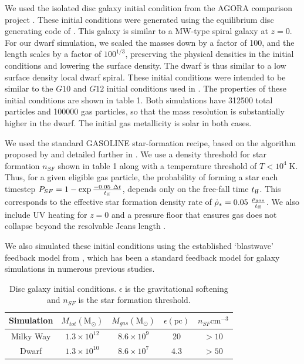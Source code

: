 We used the isolated disc galaxy initial condition from the AGORA comparison
project \citep{Kim2013}.  These initial conditions were generated using the
equilibrium disc generating code of \citet{Springel2005}.
This galaxy is similar to a MW-type spiral galaxy
at $z=0$.  For our dwarf simulation, we scaled the masses down by a factor of
100, and the length scales by a factor of $100^{1/3}$, preserving the physical
densities in the initial conditions and lowering the surface density.  The dwarf
is thus similar to a low surface density local dwarf spiral.  These initial
conditions were intended to be similar to the $G10$ and $G12$ initial conditions
used in \citet{DallaVecchia2012}. The properties of these initial conditions are
shown in table 1.  Both simulations have 312500 total particles and 100000 gas
particles, so that the mass resolution is substantially higher in the dwarf.  The
initial gas metallicity is solar in both cases.

We used the standard {\sc GASOLINE} star-formation recipe, based on the
algorithm proposed by \citet{Katz1992} and detailed further in
\citet{Stinson2006}.  We use a density threshold for star formation $n_{SF}$
shown in table 1 along with a temperature threshold of $T < 10^4\;\mathrm{K}$.
Thus, for a given eligible gas particle, the probability of forming a star each
timestep $P_{SF} = 1-\exp{-0.05\ \Delta t\over t_{\rm ff}}$, depends only on the
free-fall time $t_{\rm ff}$.  This corresponds to the effective star formation
density rate of $\dot \rho_* = 0.05\ \frac{\rho_{gas}}{t_{\rm ff}}$.  We also
include UV heating for $z=0$ \citep[as in][]{Shen2010} and a pressure floor that
ensures gas does not collapse beyond the resolvable Jeans length
\citep{Machacek2001}.  

We also simulated these initial conditions using the established `blastwave'
feedback model from \citep{Stinson2006}, which has been a standard feedback
model for galaxy simulations in numerous previous studies.
\begin{table}
    \begin{tabular}{ c c c c c}
        \hline
        Simulation & $M_{tot} \mathrm{(M_\odot)}$ & $M_{gas} \mathrm{(M_\odot)}$
        & $\epsilon \mathrm{(pc)}$ & $n_{SF} \mathrm{cm^{-3}}$\\
        \hline
        Milky Way & $1.3\times10^{12}$ & $8.6\times10^9$ & 20  & $>10$\\
        Dwarf & $1.3\times10^{10}$ &  $8.6\times10^7$ & 4.3 & $>50$\\
    \end{tabular}
    \caption[Isolated Disc Initial Conditions]{Disc galaxy initial conditions.  $\epsilon$ is the gravitational
    softening and $n_{SF}$ is the star formation threshold.}
\end{table}

